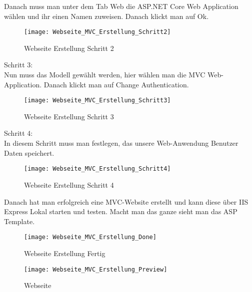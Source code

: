 {Danach muss man unter dem Tab Web die ASP.NET Core Web Application wählen und ihr einen Namen zuweisen. Danach klickt man auf Ok.\\
\begin{figure}[H]
    \texttt{[image: Webseite\_MVC\_Erstellung\_Schritt2]}
    \caption{Webseite Erstellung Schritt 2}
    \label{fig:weberstell2}
\end{figure}
Schritt 3:\\
Nun muss das Modell gewählt werden, hier wählen man die MVC Web-Application. Danach klickt man auf Change Authentication. \\
\begin{figure}[H]
    \texttt{[image: Webseite\_MVC\_Erstellung\_Schritt3]}
    \caption{Webseite Erstellung Schritt 3}
    \label{fig:weberstell3}
\end{figure}Schritt 4:\\
In diesem Schritt muss man festlegen, das unsere Web-Anwendung Benutzer Daten speichert.
\begin{figure}[H]
    \texttt{[image: Webseite\_MVC\_Erstellung\_Schritt4]}
    \caption{Webseite Erstellung Schritt 4}
    \label{fig:weberstell4}
\end{figure}
Danach hat man erfolgreich eine MVC-Website erstellt und kann diese über IIS Express Lokal starten und testen. Macht man das ganze sieht man das ASP Template.\\
\begin{figure}[H]
    \texttt{[image: Webseite\_MVC\_Erstellung\_Done]}
    \caption{Webseite Erstellung Fertig}
    \label{fig:weberstellfertig}
\end{figure}
\begin{figure}[H]
    \texttt{[image: Webseite\_MVC\_Erstellung\_Preview]}
    \caption{Webseite}
    \label{fig:webseite}
\end{figure}
}
